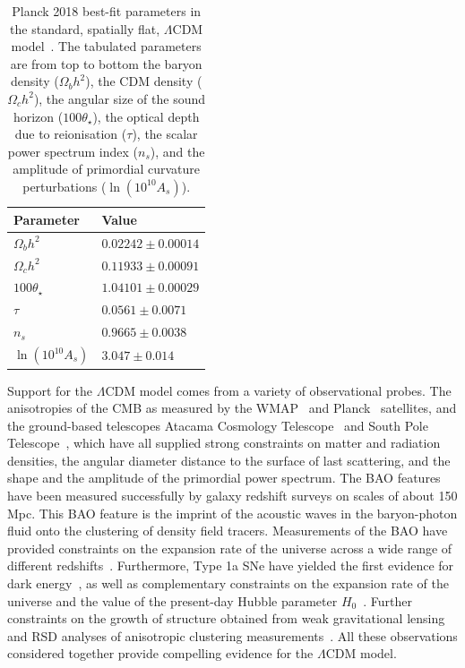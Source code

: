 \begin{table}[ht]
	\centering
\begin{tabular}{ l | l}
	\textbf{Parameter} & \textbf{Value} \\
	\hline
	$\Omega_b h^2$ & $0.02242 \pm 0.00014$ \\
	$\Omega_c h^2$  & $0.11933 \pm 0.00091$ \\
	$100 \theta_\star$ & $1.04101 \pm 0.00029$ \\
	$\tau$  & $0.0561 \pm 0.0071$ \\
	$n_s$  & $0.9665 \pm 0.0038$ \\
	$\ln (10^{10} A_s)$  & $3.047 \pm 0.014$
\end{tabular}
	\caption{Planck 2018 best-fit parameters in the standard, spatially flat, $\Lambda$CDM model~\cite{Aghanim:2018eyx}. The tabulated parameters are from top to bottom the baryon density ($\Omega_b h^2$), the CDM density ($\Omega_c h^2$), the angular size of the sound horizon ($100 \theta_\star$), the optical depth due to reionisation ($\tau$), the scalar power spectrum index ($n_s$), and the amplitude of primordial curvature perturbations ($\ln (10^{10} A_s)$).} \label{tab:planck2018params}
\end{table}

Support for the $\Lambda$CDM model comes from a variety of observational probes. The anisotropies of the CMB as measured by the WMAP~\cite{Bennett:2013} and Planck~\cite{Aghanim:2018eyx} satellites, and the ground-based telescopes Atacama Cosmology Telescope~\cite{Das:2013zf} and South Pole Telescope~\cite{George:2014oba}, which have all supplied strong constraints on matter and radiation densities, the angular diameter distance to the surface of last scattering, and the shape and the amplitude of the primordial power spectrum. The BAO features have been measured successfully by galaxy redshift surveys on scales of about 150 Mpc. This BAO feature is the imprint of the acoustic waves in the baryon-photon fluid onto the clustering of density field tracers. Measurements of the BAO have provided constraints on the expansion rate of the universe across a wide range of different redshifts~\cite{BOSS:2016wmc,Ross:2014qpa,Oka:2013cba,Sanchez:2006,Beutler:2011,Kazin:2014qga}. Furthermore, Type 1a SNe have yielded the first evidence for dark energy~\cite{SupernovaSearchTeam:1998fmf,SupernovaCosmologyProject:1998vns}, as well as complementary constraints on the expansion rate of the universe and the value of the present-day Hubble parameter $H_0$~\cite{Freedman:2012,Riess:2016jrr,Suzuki:2012,SDSS:2014iwm}. Further constraints on the growth of structure obtained from weak gravitational lensing~\cite{DES:2017qwj,Heymans:2013fya} and RSD analyses of anisotropic clustering measurements~\cite{BOSS:2016psr,BOSS:2016teh}. All these observations considered together provide compelling evidence for the $\Lambda$CDM model.

